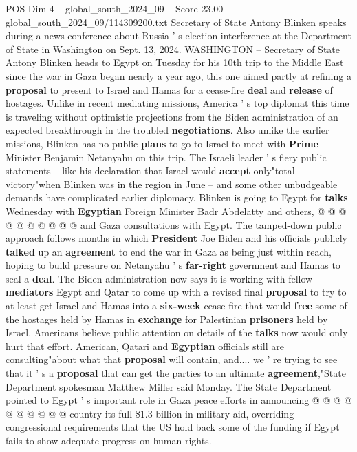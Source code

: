 \begin{textsample}{POS Dim 4 – global\_south\_2024\_09 – Score 23.00 – global\_south\_2024\_09/114309200.txt}  \label{ex:f4_pos_293}
Secretary of State Antony Blinken speaks during a news conference about Russia ' s election interference at the Department of State in Washington on Sept. 13, 2024.
WASHINGTON -- Secretary of State Antony Blinken heads to Egypt on Tuesday for his 10th trip to the Middle East since the war in Gaza began nearly a year ago, this one aimed partly at refining a \textbf{proposal} to present to Israel and Hamas for a cease-fire \textbf{deal} and \textbf{release} of hostages.
Unlike in recent mediating missions, America ' s top diplomat this time is traveling without optimistic projections from the Biden administration of an expected breakthrough in the troubled \textbf{negotiations}.
Also unlike the earlier missions, Blinken has no public \textbf{plans} to go to Israel to meet with \textbf{Prime} Minister Benjamin Netanyahu on this trip.
The Israeli leader ' s fiery public statements -- like his declaration that Israel would \textbf{accept} only"total victory"when Blinken was in the region in June -- and some other unbudgeable demands have complicated earlier diplomacy.
Blinken is going to Egypt for \textbf{talks} Wednesday with \textbf{Egyptian} Foreign Minister Badr Abdelatty and others, @ @ @ @ @ @ @ @ @ @ and Gaza consultations with Egypt.
The tamped-down public approach follows months in which \textbf{President} Joe Biden and his officials publicly \textbf{talked} up an \textbf{agreement} to end the war in Gaza as being just within reach, hoping to build pressure on Netanyahu ' s \textbf{far-right} government and Hamas to seal a \textbf{deal}.
The Biden administration now says it is working with fellow \textbf{mediators} Egypt and Qatar to come up with a revised final \textbf{proposal} to try to at least get Israel and Hamas into a \textbf{six-week} cease-fire that would \textbf{free} some of the hostages held by Hamas in \textbf{exchange} for Palestinian \textbf{prisoners} held by Israel.
Americans believe public attention on details of the \textbf{talks} now would only hurt that effort.
American, Qatari and \textbf{Egyptian} officials still are consulting"about what that \textbf{proposal} will contain, and.... we ' re trying to see that it ' s a \textbf{proposal} that can get the parties to an ultimate \textbf{agreement},"State Department spokesman Matthew Miller said Monday.
The State Department pointed to Egypt ' s important role in Gaza peace efforts in announcing @ @ @ @ @ @ @ @ @ @ country its full \$1.3 billion in military aid, overriding congressional requirements that the US hold back some of the funding if Egypt fails to show adequate progress on human rights.

\end{textsample}
